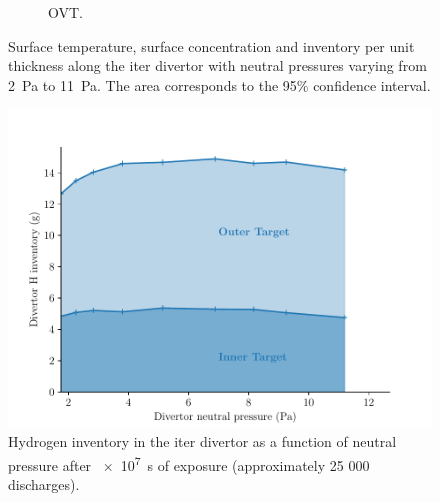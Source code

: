 \begin{figure}[h!]
\begin{subfigure}{0.58\linewidth}
        \caption{OVT.}
    \end{subfigure}
    \caption{Surface temperature, surface concentration and \gls{inventory} per unit thickness along the \gls{iter} \gls{divertor} with neutral pressures varying from \SI{2}{Pa} to \SI{11}{Pa}. The area corresponds to the 95\% confidence interval.}
\end{figure}


\begin{figure}[h]
    \centering
    \includegraphics[width=\linewidth]{Figures/Chapter4/ITER/inventory_vs_divertor_pressure.pdf}
    \caption{Hydrogen \gls{inventory} in the \gls{iter} \gls{divertor} as a function of neutral pressure after \SI{e7}{s} of exposure (approximately 25 000 discharges).}
\end{figure}


